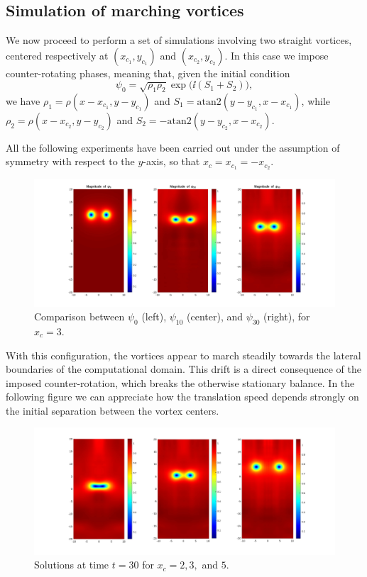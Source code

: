 \subsection{Simulation of marching vortices}

We now proceed to perform a set of simulations involving two straight vortices, centered respectively at $(x_{c_1}, y_{c_1})$ and $(x_{c_2}, y_{c_2})$. In this case we impose counter-rotating phases, meaning that, given the initial condition 
\[
    \psi_0 = \sqrt{\rho_1 \rho_2}\exp\bigl(\ii (S_1 + S_2)\bigr),
\] 
we have $\rho_1 = \rho(x - x_{c_1}, y - y_{c_1})$ and $S_1 = \mathrm{atan2}(y - y_{c_1}, x - x_{c_1})$, while $\rho_2 = \rho(x - x_{c_2}, y - y_{c_2})$ and $S_2 = -\mathrm{atan2}(y - y_{c_2}, x - x_{c_2})$.

All the following experiments have been carried out under the assumption of symmetry with respect to the $y$-axis, so that $x_c = x_{c_1} = -x_{c_2}$.

\begin{figure}[H]
    \centering
    \includegraphics[width=\textwidth]{img/str_01030_3.pdf}
    \caption{Comparison between $\psi_0$ (left), $\psi_{10}$ (center), and $\psi_{30}$ (right), for $x_c = 3$.}
\end{figure}

With this configuration, the vortices appear to march steadily towards the lateral boundaries of the computational domain. This drift is a direct consequence of the imposed counter-rotation, which breaks the otherwise stationary balance. In the following figure we can appreciate how the translation speed depends strongly on the initial separation between the vortex centers.

\begin{figure}[H]
    \centering
    \includegraphics[width=\textwidth]{img/str_235_30t.pdf}
    \caption{Solutions at time $t = 30$ for $x_c = 2, 3,$ and $5$.}
\end{figure}

